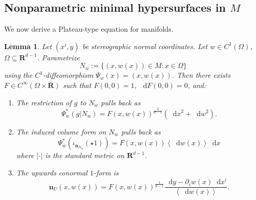 \documentclass[reqno,10pt]{amsart}
\newcommand{\RR}{\mathbf{R}}
\newcommand*\dif{\mathop{}\!\mathrm{d}}
\newcommand{\normal}{\mathbf n}
\def\Japan#1{\left \langle #1 \right \rangle}
\newtheorem{lemma}[theorem]{Lemma}
\theoremstyle{definition}
\numberwithin{equation}{section}
\begin{document}
\subsection{Nonparametric minimal hypersurfaces in \texorpdfstring{$M$}{M}}
We now derive a Plateau-type equation for manifolds.

\begin{lemma}\label{Plateau setup lemma}
Let $(x^i, y)$ be stereographic normal coordinates.
Let $w \in C^1(\Omega)$, $\Omega \subseteq \RR^{d - 1}$.
Parametrize
\begin{equation}\label{definition of graph}
N_w := \{(x, w(x)) \in M: x \in \Omega\}
\end{equation}
using the $C^1$-diffeomorphism $\Psi_w(x) = (x, w(x))$. Then there exists $F \in C^\infty(\Omega \times \RR)$ such that $F(0, 0) = 1$, $\dif F(0, 0) = 0$, and:
\begin{enumerate}
\item The restriction of $g$ to $N_w$ pulls back as
\begin{equation}\label{restricted metric in isothermal coords}
\Psi_w^*(g|N_w) = F(x, w(x))^{\frac{2}{d - 1}}(\dif x^2 + \dif w^2).
\end{equation}
\item The induced volume form on $N_w$ pulls back as
\begin{equation}\label{restricted measure in isothermal coords}
\Psi_w^*(\iota_{\normal_{N_w}}(\star 1)) = F(x, w(x)) \Japan{\dif w(x)} \dif x
\end{equation}
where $|\cdot|$ is the standard metric on $\RR^{d - 1}$.
\item The upwards conormal $1$-form is
\begin{equation}\label{conormal in isothermal coords}
\normal_U(x, w(x)) = F(x, w(x))^{\frac{1}{d - 1}} \frac{\dif y - \partial_i w(x) \dif x^i}{\Japan{\dif w(x)}}.
\end{equation}
\end{enumerate}
\end{lemma}
\end{document}

